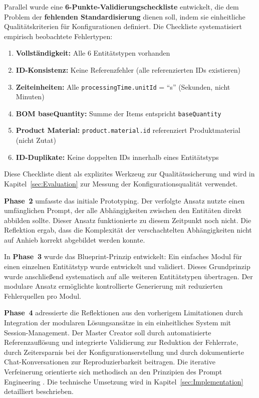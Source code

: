 Parallel wurde eine \textbf{6-Punkte-Validierungscheckliste} entwickelt, die dem Problem der \textbf{fehlenden Standardisierung} dienen soll, indem sie einheitliche Qualitätskriterien für Konfigurationen definiert. Die Checkliste systematisiert empirisch beobachtete Fehlertypen:

\begin{enumerate}
    \item \textbf{Vollständigkeit:} Alle 6 Entitätstypen vorhanden
    \item \textbf{ID-Konsistenz:} Keine Referenzfehler (alle referenzierten IDs existieren)
    \item \textbf{Zeiteinheiten:} Alle \texttt{processingTime.unitId} = ``s'' (Sekunden, nicht Minuten)
    \item \textbf{BOM baseQuantity:} Summe der Items entspricht \texttt{baseQuantity}
    \item \textbf{Product Material:} \texttt{product.material.id} referenziert Produktmaterial (nicht Zutat)
    \item \textbf{ID-Duplikate:} Keine doppelten IDs innerhalb eines Entitätstyps
\end{enumerate}

Diese Checkliste dient als explizites Werkzeug zur Qualitätssicherung und wird in Kapitel~\ref{sec:Evaluation} zur Messung der Konfigurationsqualität verwendet.

\textbf{Phase~2} umfasste das initiale Prototyping. Der verfolgte Ansatz nutzte einen umfänglichen Prompt, der alle Abhängigkeiten zwischen den Entitäten direkt abbilden sollte. Dieser Ansatz funktionierte zu diesem Zeitpunkt noch nicht. Die Reflektion ergab, dass die Komplexität der verschachtelten Abhängigkeiten nicht auf Anhieb korrekt abgebildet werden konnte.

In \textbf{Phase~3} wurde das Blueprint-Prinzip entwickelt: Ein einfaches Modul für einen einzelnen Entitätstyp wurde entwickelt und validiert. Dieses Grundprinzip wurde anschließend systematisch auf alle weiteren Entitätstypen übertragen. Der modulare Ansatz ermöglichte kontrollierte Generierung mit reduzierten Fehlerquellen pro Modul.

\textbf{Phase~4} adressierte die Reflektionen aus den vorherigem Limitationen durch Integration der modularen Lösungsansätze in ein einheitliches System mit Session-Management. Der Master Creator soll durch automatisierte Referenzauflösung und integrierte Validierung zur Reduktion der Fehlerrate, durch Zeitersparnis bei der Konfigurationserstellung und durch dokumentierte Chat-Konversationen zur Reproduzierbarkeit beitragen. Die iterative Verfeinerung orientierte sich methodisch an den Prinzipien des Prompt Engineering \citep{openai:codex2024}. Die technische Umsetzung wird in Kapitel~\ref{sec:Implementation} detailliert beschrieben.


